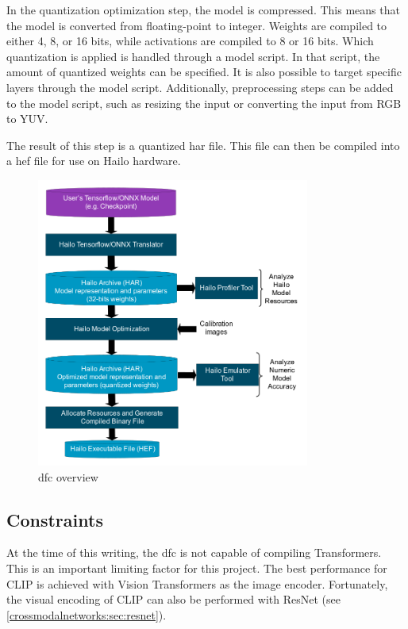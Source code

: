 In the quantization optimization step, the model is compressed.  
This means that the model is converted from floating-point to integer.  
Weights are compiled to either 4, 8, or 16 bits, while activations are compiled to 8 or 16 bits.  
Which quantization is applied is handled through a model script.  
In that script, the amount of quantized weights can be specified.  
It is also possible to target specific layers through the model script.  
Additionally, preprocessing steps can be added to the model script, such as resizing the input or converting the input from RGB to YUV.  

The result of this step is a quantized \acrshort{har} file.  
This file can then be compiled into a \acrshort{hef} file for use on Hailo hardware.  

\begin{figure}[]
    \centering
    \includegraphics[width=0.8\textwidth]{Images/Hardware/model_build_overview_with_onnx_and_hef_w_har.png}
    \caption{\Acrlong{dfc} overview \cite{hailo_dataflow_compiler}}
    \label{fig:hardware:dfcoverview}
\end{figure}

\subsection{Constraints}
At the time of this writing, the \acrshort{dfc} is not capable of compiling Transformers.  
This is an important limiting factor for this project.  
The best performance for CLIP is achieved with Vision Transformers as the image encoder.  
Fortunately, the visual encoding of CLIP can also be performed with ResNet (see \cref{crossmodalnetworks:sec:resnet}).  

